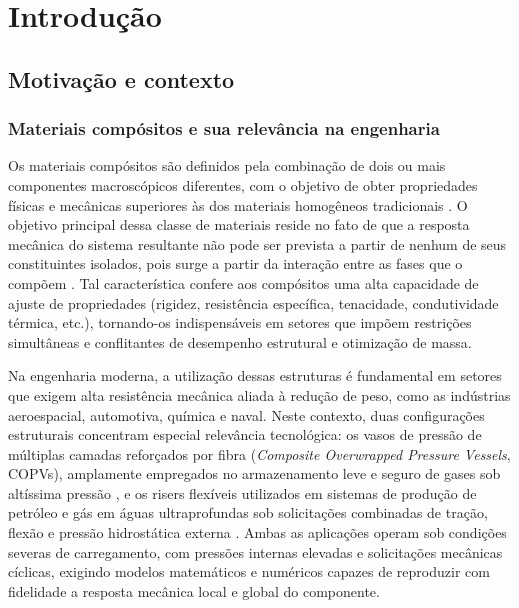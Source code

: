 \chapter{Introdução}

\section{Motivação e contexto}

\subsection{Materiais compósitos e sua relevância na engenharia}

Os materiais compósitos são definidos pela combinação de dois ou mais componentes macroscópicos diferentes, com o objetivo de obter propriedades físicas e mecânicas superiores às dos materiais homogêneos tradicionais \cite{RMJones2018}. O objetivo principal dessa classe de materiais reside no fato de que a resposta mecânica do sistema resultante não pode ser prevista a partir de nenhum de seus constituintes isolados, pois surge a partir da interação entre as fases que o compõem \cite{PartonReport}. Tal característica confere aos compósitos uma alta capacidade de ajuste de propriedades (rigidez, resistência específica, tenacidade, condutividade térmica, etc.), tornando-os indispensáveis em setores que impõem restrições simultâneas e conflitantes de desempenho estrutural e otimização de massa.

Na engenharia moderna, a utilização dessas estruturas é fundamental em setores que exigem alta resistência mecânica aliada à redução de peso, como as indústrias aeroespacial, automotiva, química e naval. Neste contexto, duas configurações estruturais concentram especial relevância tecnológica: os vasos de pressão de múltiplas camadas reforçados por fibra (\textit{Composite Overwrapped Pressure Vessels}, COPVs), amplamente empregados no armazenamento leve e seguro de gases sob altíssima pressão \cite[p.~1]{Zhang2022}, e os risers flexíveis utilizados em sistemas de produção de petróleo e gás em águas ultraprofundas sob solicitações combinadas de tração, flexão e pressão hidrostática externa \cite{Liu2026}. Ambas as aplicações operam sob condições severas de carregamento, com pressões internas elevadas e solicitações mecânicas cíclicas, exigindo modelos matemáticos e numéricos capazes de reproduzir com fidelidade a resposta mecânica local e global do componente.

